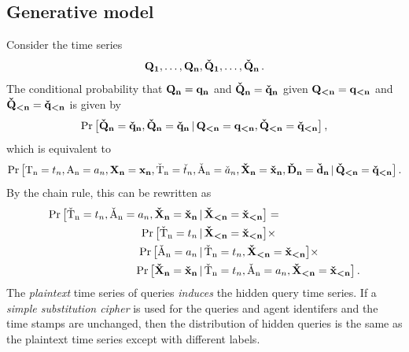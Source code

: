\documentclass[final,11pt]{article}
\newcommand{\hrs}[1][]{%
   \ifthenelse{ \equal{#1}{} }
      {\ensuremath{\vec{\check{d}}}}
      {\ensuremath{\vec{\check{d}_{#1}}}}
}
\newcommand{\rvhrs}[1][]{%
   \ifthenelse{ \equal{#1}{} }
      {\ensuremath{\rv{\vec{\check{D}}}}}
      {\ensuremath{\rv{\vec{\check{D}_{#1}}}}}
}
\newcommand{\hqb}[1][]{%
   \ifthenelse{ \equal{#1}{} }
      {\ensuremath{\vec{\check{x}}}}
      {\ensuremath{\vec{\check{x}_{#1}}}}
}
\newcommand{\rvhqb}[1][]{%
   \ifthenelse{ \equal{#1}{} }
      {\ensuremath{\rv{\vec{\check{X}}}}}
      {\ensuremath{\rv{\vec{\check{X}_{#1}}}}}
}
\newcommand{\qb}[1][]{%
   \ifthenelse{ \equal{#1}{} }
      {\ensuremath{\vec{x}}}
      {\ensuremath{\vec{x_{#1}}}}
}
\newcommand{\rvqb}[1][]{%
   \ifthenelse{ \equal{#1}{} }
      {\ensuremath{\rv{\vec{X}}}}
      {\ensuremath{\rv{\vec{X_{#1}}}}}
}
\newcommand{\ts}[1][]{%
   \ifthenelse{ \equal{#1}{} }
      {\ensuremath{t}}
      {\ensuremath{t_{#1}}}
}
\newcommand{\rvts}[1][]{%
   \ifthenelse{ \equal{#1}{} }
      {\ensuremath{\rv{T}}}
      {\ensuremath{\rv{T_{#1}}}}
}
\newcommand{\hts}[1][]{%
   \ifthenelse{ \equal{#1}{} }
      {\ensuremath{\check{t}}}
      {\ensuremath{\check{t}_{#1}}}
}
\newcommand{\rvhts}[1][]{%
   \ifthenelse{ \equal{#1}{} }
      {\ensuremath{\rv{\check{T}}}}
      {\ensuremath{\rv{\check{T}_{#1}}}}
}
\newcommand{\hsa}[1][]{%
   \ifthenelse{ \equal{#1}{} }
      {\ensuremath{\check{a}}}
      {\ensuremath{\check{a}_{#1}}}
}
\newcommand{\rvhsa}[1][]{%
   \ifthenelse{ \equal{#1}{} }
      {\ensuremath{\rv{\check{A}}}}
      {\ensuremath{\rv{\check{A}_{#1}}}}
}
\newcommand{\sa}[1][]{%
   \ifthenelse{ \equal{#1}{} }
      {\ensuremath{a}}
      {\ensuremath{a_{#1}}}
}
\newcommand{\rvsa}[1][]{%
   \ifthenelse{ \equal{#1}{} }
      {\ensuremath{\rv{A}}}
      {\ensuremath{\rv{A_{#1}}}}
}
\newcommand{\htup}[1][]{%
   \ifthenelse{ \equal{#1}{} }
      {\ensuremath{\vec{\check{q}}}}
      {\ensuremath{\vec{\check{q}_{#1}}}}
}
\newcommand{\rvhtup}[1][]{%
   \ifthenelse{ \equal{#1}{} }
      {\ensuremath{\rv{\vec{\check{Q}}}}}
      {\ensuremath{\rv{\vec{\check{Q}_{#1}}}}}
}
\newcommand{\tup}[1][]{%
   \ifthenelse{ \equal{#1}{} }
      {\ensuremath{\vec{q}}}
      {\ensuremath{\vec{q_{#1}}}}
}
\newcommand{\rvtup}[1][]{%
   \ifthenelse{ \equal{#1}{} }
      {\ensuremath{\rv{\vec{Q}}}}
      {\ensuremath{\rv{\vec{Q_{#1}}}}}
}
\newcommand{\rv}[1]{\mathrm{#1}}
\newcommand{\given}{{\,|\,}}
\renewcommand{\vec}[1]{\boldsymbol{\mathbf{#1}}}
\numberwithin{equation}{section}
\theoremstyle{plain}
\theoremstyle{remark}
\begin{document}
\subsection{Generative model}
\label{subsec:gen_model}
Consider the time series
\begin{equation}
    \rvtup[1],\ldots,\rvtup[n],\rvhtup[1],\ldots,\rvhtup[n]\,.
\end{equation}
The conditional probability that $\rvtup[n] = \tup[n]$ and $\rvhtup[n] = \htup[n]$ given $\rvtup[<n] = \tup[<n]$ and $\rvhtup[<n] = \htup[<n]$ is given by
\begin{equation}
    \Pr\big[
        \rvhtup[n] = \htup[n], \rvhtup[n] = \htup[n] \given
        \rvtup[<n] = \tup[<n], \rvhtup[<n] = \htup[<n]\big]\,,
\end{equation}
which is equivalent to
\begin{equation}
    \Pr\big[
        \rvts[n] = \ts[n],
        \rvsa[n] = \sa[n],
        \rvqb[n] = \qb[n],    
        \rvhts[n] = \hts[n],
        \rvhsa[n] = \hsa[n],
        \rvhqb[n] = \hqb[n],
        \rvhrs[n] = \hrs[n]
        \given
            \rvhtup[<n] = \htup[<n]\big]\,.
\end{equation}
By the chain rule, this can be rewritten as
\begin{equation}
\begin{split}
    \Pr\big[
        \rvhts[n] = t_n, \rvhsa[n] = a_n, \rvhqb[n] = \hqb[n] &\given \rvhqb[<n] = \hqb[<n]
    \big] =\\
    \Pr\big[
        \rvhts[n] = t_n &\given \rvhqb[<n] = \hqb[<n]
    \big] \times\\
    \Pr\big[
        \rvhsa[n] = a_n &\given \rvhts[n] = t_n, \rvhqb[<n] = \hqb[<n]
    \big] \times\\    
    \Pr\big[
        \rvhqb[n] = \hqb[n] &\given \rvhts[n] = t_n, \rvhsa[n] = a_n, \rvhqb[<n] = \hqb[<n]
    \big]\,.
\end{split}
\end{equation}
The \emph{plaintext} time series of queries \emph{induces} the hidden query time series. If a \emph{simple substitution cipher} is used for the queries and agent identifers and the time stamps are unchanged, then the distribution of hidden queries is the same as the plaintext time series except with different labels.

\end{document}
